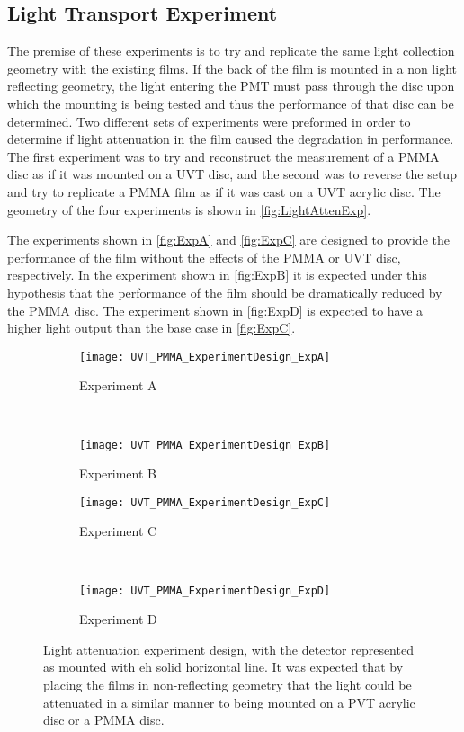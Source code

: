 \documentclass[draftcls,onecolumn]{IEEEtran}
\begin{document}
\subsection{Light Transport Experiment}
The premise of these experiments is to try and replicate the same light collection geometry with the existing films.
If the back of the film is mounted in a non light reflecting geometry, the light entering the PMT must pass through the disc upon which the mounting is being tested and thus the performance of that disc can be determined.
Two different sets of experiments were preformed in order to determine if light attenuation in the film caused the degradation in performance.
The first experiment was to try and reconstruct the measurement of a PMMA disc as if it was mounted on a UVT disc, and the second was to reverse the setup and try to replicate a PMMA film as if it was cast on a UVT acrylic disc.
The geometry of the four experiments is shown in \autoref{fig:LightAttenExp}.

The experiments shown in \autoref{fig:ExpA} and \autoref{fig:ExpC} are designed to provide the performance of the film without the effects of the PMMA or UVT disc, respectively.
In the experiment shown in \autoref{fig:ExpB} it is expected under this hypothesis that the performance of the film should be dramatically reduced by the PMMA disc.
The experiment shown in \autoref{fig:ExpD} is expected to have a higher light output than the base case in \autoref{fig:ExpC}.
\begin{figure}
  \centering
  \begin{subfigure}[b]{0.45\textwidth}
    \centering
    \texttt{[image: UVT\_PMMA\_ExperimentDesign\_ExpA]}
    \caption{Experiment A}
    \label{fig:ExpA}
  \end{subfigure}%
  ~
  \begin{subfigure}[b]{0.45\textwidth}
    \centering
    \texttt{[image: UVT\_PMMA\_ExperimentDesign\_ExpB]}
    \caption{Experiment B}
    \label{fig:ExpB}
  \end{subfigure}%
  
  \begin{subfigure}[b]{0.45\textwidth}
    \centering
    \texttt{[image: UVT\_PMMA\_ExperimentDesign\_ExpC]}
    \caption{Experiment C}
    \label{fig:ExpC}
  \end{subfigure}%
  ~
  \begin{subfigure}[b]{0.45\textwidth}
    \centering
    \texttt{[image: UVT\_PMMA\_ExperimentDesign\_ExpD]}
    \caption{Experiment D}
    \label{fig:ExpD}
  \end{subfigure}
  \caption[Light Attenuation Experiment Design]{Light attenuation experiment design, with the detector represented as mounted with eh solid horizontal line. It was expected that by placing the films in non-reflecting geometry that the light could be attenuated in a similar manner to being mounted on a PVT acrylic disc or a PMMA disc.}
  \label{fig:LightAttenExp}
\end{figure}
\end{document}
